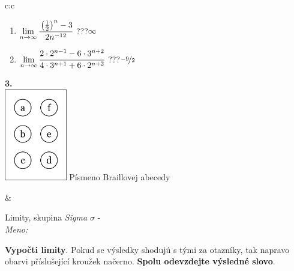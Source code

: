 \documentclass[10pt]{report}
\begin{document}
\begin{tabular}{c:c}
\begin{minipage}[c][104.5mm][t]{0.5\linewidth}
\begin{center}
\begin{minipage}{0.79\linewidth}
\begin{center}
\begin{varwidth}{\linewidth}
\begin{enumerate}
\item $\lim\limits_{n\to\infty}\cfrac{\left(\frac{1}{2}\right)^n -3}{2n^{-12}}$\quad \dotfill\; ???\;\dotfill \quad $\infty$
\item $\lim\limits_{n\to\infty}\cfrac{2\cdot 2^{n-1}-6\cdot 3^{n+2}}{4\cdot 3^{n+1}+6\cdot 2^{n+2}}$\quad \dotfill\; ???\;\dotfill \quad $\nicefrac{-9}{2}$
\end{enumerate}
\end{varwidth}
\end{center}
\end{minipage}
\begin{minipage}{0.20\linewidth}
\begin{center}
{\Huge\bfseries 3.} \\[2mm]
\includegraphics[height=40mm]{../images/braille.png}
{\small Písmeno Braillovej abecedy}
\end{center}
\end{minipage}
\end{center}
\end{minipage}
&
\begin{minipage}[c][104.5mm][t]{0.5\linewidth}
\begin{center}
\vspace{7mm}
{\huge Limity, skupina \textit{Sigma $\sigma$} -}\\[5mm]
\textit{Meno:}\phantom{xxxxxxxxxxxxxxxxxxxxxxxxxxxxxxxxxxxxxxxxxxxxxxxxxxxxxxxxxxxxxxxxx}\\[5mm]
\begin{minipage}{0.95\linewidth}
\begin{center}
\textbf{Vypočti limity}. Pokud se výsledky shodujú s tými za otazníky, tak napravo\\obarvi příslušející kroužek načerno. \textbf{Spolu odevzdejte výsledné slovo}.
\end{center}
\end{minipage}
\\[1mm]
\begin{minipage}{0.79\linewidth}
\begin{center}
\begin{varwidth}{\linewidth}

\end{varwidth}
\end{center}
\end{minipage}
\end{center}
\end{minipage}
\end{tabular}
\end{document}
